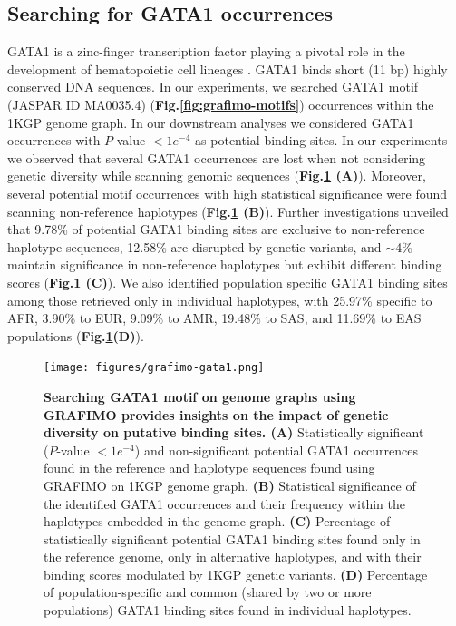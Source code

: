 \documentclass[a4paper, titlepage, openright]{book}
\newcommand{\grafimo}{GRAFIMO\xspace}
\begin{document}
\subsection{Searching for GATA1 occurrences}
GATA1 is a zinc-finger transcription factor playing a pivotal role in the development of hematopoietic cell lineages \citep{calligaris1995alternative}. GATA1 binds short (11 bp) highly conserved DNA sequences. In our experiments, we searched GATA1 motif (JASPAR ID MA0035.4) (\textbf{Fig.\ref{fig:grafimo-motifs}}) occurrences within the 1KGP genome graph. In our downstream analyses we considered GATA1 occurrences with $P$-value $< 1e^{-4}$ as potential binding sites. In our experiments we observed that several GATA1 occurrences are lost when not considering genetic diversity while scanning genomic sequences (\textbf{Fig.\ref{fig:grafimo-gata1} (A)}). Moreover, several potential motif occurrences with high statistical significance were found scanning non-reference haplotypes (\textbf{Fig.\ref{fig:grafimo-gata1} (B)}). Further investigations unveiled that 9.78\% of potential GATA1 binding sites are exclusive to non-reference haplotype sequences, 12.58\% are disrupted by genetic variants, and $\sim$4\% maintain significance in non-reference haplotypes but exhibit different binding scores (\textbf{Fig.\ref{fig:grafimo-gata1} (C)}). We also identified population specific GATA1 binding sites among those retrieved only in individual haplotypes, with 25.97\% specific to AFR, 3.90\% to EUR, 9.09\% to AMR, 19.48\% to SAS, and 11.69\% to EAS populations (\textbf{Fig.\ref{fig:grafimo-gata1}(D)}).

\begin{figure}
    \centering
    \texttt{[image: figures/grafimo-gata1.png]}
    \caption[Searching GATA1 motif on genome graphs using \grafimo provides insights on the impact of genetic diversity on putative binding sites]{\textbf{Searching GATA1 motif on genome graphs using \grafimo provides insights on the impact of genetic diversity on putative binding sites. (A)} Statistically significant ($P$-value $< 1e^{-4}$) and non-significant potential GATA1 occurrences found in the reference and haplotype sequences found using \grafimo on 1KGP genome graph. \textbf{(B)} Statistical significance of the identified GATA1 occurrences and their frequency within the haplotypes embedded in the genome graph. \textbf{(C)} Percentage of statistically significant potential GATA1 binding sites found only in the reference genome, only in alternative haplotypes, and with their binding scores modulated by 1KGP genetic variants. \textbf{(D)} Percentage of population-specific and common (shared by two or more populations) GATA1 binding sites found in individual haplotypes.}
    \label{fig:grafimo-gata1}
\end{figure}
\end{document}
